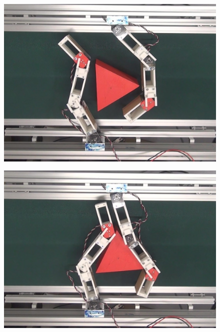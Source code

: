 \documentclass[a4paper,twoside,12pt,papersize, dvipdfmx]{iirthesis}
\begin{document}
\begin{figure}[b]
\centering
\begin{minipage}{0.249\hsize}
\centering
\includegraphics[width=0.98\hsize]{fig/4-manipulation-result/Triangle/1-1.jpg}
\subcaption{}\label{}
\end{minipage}\hfill
\begin{minipage}{0.249\hsize}
\centering
\includegraphics[width=0.98\hsize]{fig/4-manipulation-result/Triangle/1-2.jpg}
\subcaption{}\label{}
\end{minipage}\hfill
\begin{minipage}{0.249\hsize}
\centering

\end{minipage}
\end{figure}
\end{document}
